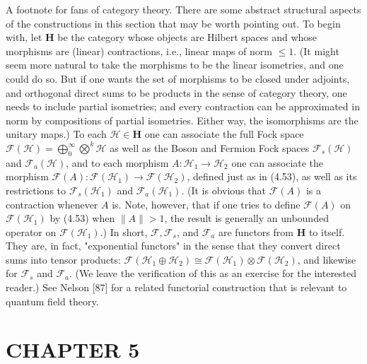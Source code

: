 \documentclass[10pt, letterpaper]{article}
\begin{document}
\pagebreak


A footnote for fans of category theory. There are some abstract structural aspects of the constructions in this section that may be worth pointing out. To begin with, let $\mathbf{H}$ be the category whose objects are Hilbert spaces and whose morphisms are (linear) contractions, i.e., linear maps of norm $\leq 1$. (It might seem more natural to take the morphisms to be the linear isometries, and one could do so. But if one wants the set of morphisms to be closed under adjoints, and orthogonal direct sums to be products in the sense of category theory, one needs to include partial isometries; and every contraction can be approximated in norm by compositions of partial isometries. Either way, the isomorphisms are the unitary maps.) To each $\mathcal{H} \in \mathbf{H}$ one can associate the full Fock space $\mathcal{F}(\mathcal{H})=\bigoplus_{0}^{\infty} \bigotimes^{k} \mathcal{H}$ as well as the Boson and Fermion Fock spaces $\mathcal{F}_{s}(\mathcal{H})$ and $\mathcal{F}_{a}(\mathcal{H})$, and to each morphism $A: \mathcal{H}_{1} \rightarrow \mathcal{H}_{2}$ one can associate the morphism $\mathcal{F}(A): \mathcal{F}\left(\mathcal{H}_{1}\right) \rightarrow \mathcal{F}\left(\mathcal{H}_{2}\right)$, defined just as in (4.53), as well as its restrictions to $\mathcal{F}_{s}\left(\mathcal{H}_{1}\right)$ and $\mathcal{F}_{a}\left(\mathcal{H}_{1}\right)$. (It is obvious that $\mathcal{F}(A)$ is a contraction whenever $A$ is. Note, however, that if one tries to define $\mathcal{F}(A)$ on $\mathcal{F}\left(\mathcal{H}_{1}\right)$ by (4.53) when $\|A\|>1$, the result is generally an unbounded operator on $\mathcal{F}\left(\mathcal{H}_{1}\right)$.) In short, $\mathcal{F}, \mathcal{F}_{s}$, and $\mathcal{F}_{a}$ are functors from $\mathbf{H}$ to itself. They are, in fact, "exponential functors" in the sense that they convert direct sums into tensor products: $\mathcal{F}\left(\mathcal{H}_{1} \oplus \mathcal{H}_{2}\right) \cong \mathcal{F}\left(\mathcal{H}_{1}\right) \otimes \mathcal{F}\left(\mathcal{H}_{2}\right)$, and likewise for $\mathcal{F}_{s}$ and $\mathcal{F}_{a}$. (We leave the verification of this as an exercise for the interested reader.) See Nelson [87] for a related functorial construction that is relevant to quantum field theory.



\pagebreak

\section*{CHAPTER 5}
\end{document}
